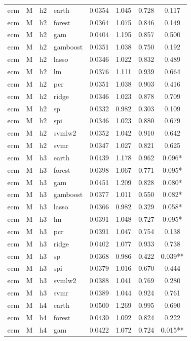 \begin{ThreePartTable}
\begin{longtable}[t]{llclcccc}
\addlinespace
ecm & M & h2 & earth & 0.0354 & 1.045 & 0.728 & 0.117\\
ecm & M & h2 & forest & 0.0364 & 1.075 & 0.846 & 0.149\\
ecm & M & h2 & gam & 0.0404 & 1.195 & 0.857 & 0.500\\
ecm & M & h2 & gamboost & 0.0351 & 1.038 & 0.750 & 0.192\\
ecm & M & h2 & lasso & 0.0346 & 1.022 & 0.832 & 0.489\\
ecm & M & h2 & lm & 0.0376 & 1.111 & 0.939 & 0.664\\
ecm & M & h2 & pcr & 0.0351 & 1.038 & 0.903 & 0.416\\
ecm & M & h2 & ridge & 0.0346 & 1.023 & 0.878 & 0.709\\
ecm & M & h2 & sp & 0.0332 & 0.982 & 0.303 & 0.109\\
ecm & M & h2 & spi & 0.0346 & 1.023 & 0.880 & 0.679\\
ecm & M & h2 & svmlw2 & 0.0352 & 1.042 & 0.910 & 0.642\\
ecm & M & h2 & svmr & 0.0347 & 1.027 & 0.821 & 0.625\\
\addlinespace
ecm & M & h3 & earth & 0.0439 & 1.178 & 0.962 & 0.096*\\
ecm & M & h3 & forest & 0.0398 & 1.067 & 0.771 & 0.095*\\
ecm & M & h3 & gam & 0.0451 & 1.209 & 0.828 & 0.080*\\
ecm & M & h3 & gamboost & 0.0377 & 1.011 & 0.550 & 0.082*\\
ecm & M & h3 & lasso & 0.0366 & 0.982 & 0.329 & 0.058*\\
ecm & M & h3 & lm & 0.0391 & 1.048 & 0.727 & 0.095*\\
ecm & M & h3 & pcr & 0.0391 & 1.047 & 0.754 & 0.138\\
ecm & M & h3 & ridge & 0.0402 & 1.077 & 0.933 & 0.738\\
ecm & M & h3 & sp & 0.0368 & 0.986 & 0.422 & 0.039**\\
ecm & M & h3 & spi & 0.0379 & 1.016 & 0.670 & 0.444\\
ecm & M & h3 & svmlw2 & 0.0388 & 1.041 & 0.769 & 0.280\\
ecm & M & h3 & svmr & 0.0389 & 1.044 & 0.924 & 0.761\\
\addlinespace
ecm & M & h4 & earth & 0.0500 & 1.269 & 0.995 & 0.690\\
ecm & M & h4 & forest & 0.0430 & 1.092 & 0.824 & 0.222\\
ecm & M & h4 & gam & 0.0422 & 1.072 & 0.724 & 0.015**\\

\end{longtable}
\end{ThreePartTable}
